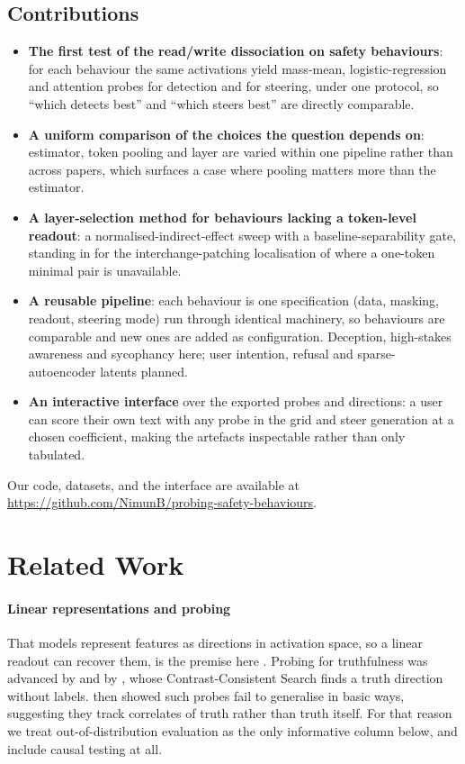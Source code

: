 \documentclass[conference]{IEEEtran}
\begin{document}
\subsection*{Contributions}
\begin{itemize}
  \item \textbf{The first test of the read/write dissociation on safety
  behaviours}: for each behaviour the same activations yield mass-mean,
  logistic-regression and attention probes for detection and for steering, under
  one protocol, so ``which detects best'' and ``which steers best'' are directly
  comparable.
  \item \textbf{A uniform comparison of the choices the question depends on}:
  estimator, token pooling and layer are varied within one pipeline rather than
  across papers, which surfaces a case where pooling matters more than the
  estimator.
  \item \textbf{A layer-selection method for behaviours lacking a token-level
  readout}: a normalised-indirect-effect sweep with a baseline-separability gate,
  standing in for the interchange-patching localisation of \citet{marks2024} where
  a one-token minimal pair is unavailable.
  \item \textbf{A reusable pipeline}: each behaviour is one specification (data,
  masking, readout, steering mode) run through identical machinery, so behaviours
  are comparable and new ones are added as configuration. Deception, high-stakes
  awareness and sycophancy here; user intention, refusal and sparse-autoencoder
  latents planned.
  \item \textbf{An interactive interface} over the exported probes and directions:
  a user can score their own text with any probe in the grid and steer generation
  at a chosen coefficient, making the artefacts inspectable rather than only
  tabulated.
\end{itemize}

Our code, datasets, and the interface are available at
\url{https://github.com/NimunB/probing-safety-behaviours}.

\section{Related Work}

\paragraph{Linear representations and probing}
That models represent features as directions in activation space, so a linear
readout can recover them, is the premise here \citep{alain2018,elhage2022}.
Probing for truthfulness was advanced by \citet{azaria2023} and by
\citet{burns2023}, whose Contrast-Consistent Search finds a truth direction
without labels. \citet{levinstein2024} then showed such probes fail to generalise
in basic ways, suggesting they track correlates of truth rather than truth itself.
For that reason we treat out-of-distribution evaluation as the only informative
column below, and include causal testing at all.
\end{document}
